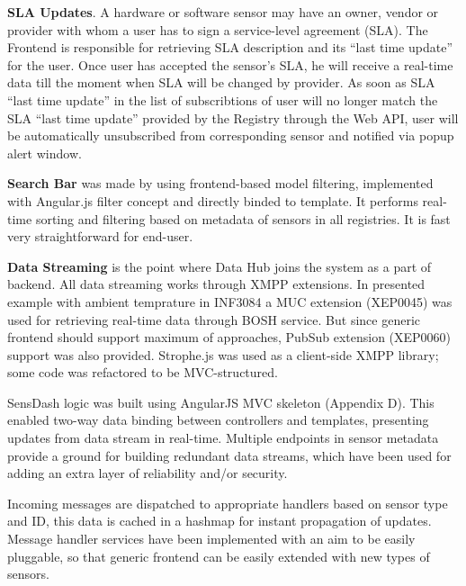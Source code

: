 \textbf{SLA Updates}. A hardware or software sensor may have an owner, vendor or provider with whom a user has to sign a service-level agreement (SLA). The Frontend is responsible for retrieving SLA description and its ``last time update'' for the user. Once user has accepted the sensor's SLA, he will receive a real-time data till the moment when SLA will be changed by provider. As soon as SLA ``last time update'' in the list of subscribtions of user will no longer match the SLA ``last time update'' provided by the Registry through the Web API, user will be automatically unsubscribed from corresponding sensor and notified via popup alert window.

\textbf{Search Bar} was made by using frontend-based model filtering, implemented with Angular.js filter concept and directly binded to template. It performs real-time sorting and filtering based on metadata of sensors in all registries. It is fast very straightforward for end-user. 

\textbf{Data Streaming} is the point where Data Hub joins the system as a part of backend. All data streaming works through XMPP extensions. In presented example with ambient temprature in INF3084 a MUC extension (XEP0045) was used for retrieving real-time data through BOSH service. But since generic frontend should support maximum of approaches, PubSub extension (XEP0060) support was also provided. Strophe.js was used as a client-side XMPP library; some code was refactored to be MVC-structured.

SensDash logic was built using AngularJS MVC skeleton (Appendix D). This enabled two-way data binding between controllers and templates, presenting updates from data stream in real-time. Multiple endpoints in sensor metadata provide a ground for building redundant data streams, which have been used for adding an extra layer of reliability and/or security. 

Incoming messages are dispatched to appropriate handlers based on sensor type and ID, this data is cached in a hashmap for instant propagation of updates. Message handler services have been implemented with an aim to be easily pluggable, so that generic frontend can be easily extended with new types of sensors.

